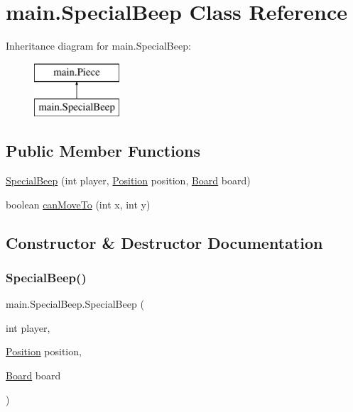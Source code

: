 \hypertarget{classmain_1_1_special_beep}{}\section{main.\+Special\+Beep Class Reference}
\label{classmain_1_1_special_beep}
Inheritance diagram for main.\+Special\+Beep\+:\begin{figure}[H]
\begin{center}
\leavevmode
\includegraphics[height=2.000000cm]{classmain_1_1_special_beep}
\end{center}
\end{figure}
\subsection*{Public Member Functions}
\begin{DoxyCompactItemize}
\item 
\hyperlink{classmain_1_1_special_beep_a7908b98b0a1c1360e803f92940034953}{Special\+Beep} (int player, \hyperlink{classmain_1_1_position}{Position} position, \hyperlink{classmain_1_1_board}{Board} board)
\item 
boolean \hyperlink{classmain_1_1_special_beep_a2065d7405cfb1d9b49d94a55123ebd35}{can\+Move\+To} (int x, int y)
\end{DoxyCompactItemize}


\subsection{Constructor \& Destructor Documentation}
\mbox{\label{classmain_1_1_special_beep_a7908b98b0a1c1360e803f92940034953}} 
\subsubsection{\texorpdfstring{Special\+Beep()}{SpecialBeep()}}
{\footnotesize\ttfamily main.\+Special\+Beep.\+Special\+Beep (\begin{DoxyParamCaption}\item[{int}]{player,  }\item[{\hyperlink{classmain_1_1_position}{Position}}]{position,  }\item[{\hyperlink{classmain_1_1_board}{Board}}]{board }\end{DoxyParamCaption})}

